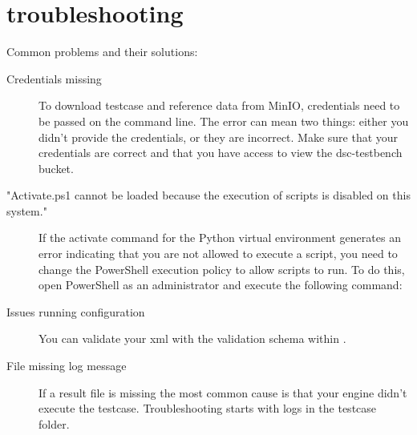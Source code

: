 \documentclass{deltares_memo}
\begin{document}
\section{troubleshooting}
\label{sec:troubleshooting}
Common problems and their solutions:
\begin{description}
\item[Credentials missing] To download testcase and reference data from MinIO, credentials need to be passed on the command line. The error can mean two things: either you didn't provide the credentials, or they are incorrect. Make sure that your credentials are correct and that you have access to view the dsc-testbench bucket.
\item["Activate.ps1 cannot be loaded because the execution of scripts is disabled on this system."] If the activate command for the Python virtual environment generates an error indicating that you are not allowed to execute a script, you need to change the PowerShell execution policy to allow scripts to run. To do this, open PowerShell as an administrator and execute the following command: 
\item[Issues running configuration] You can validate your xml with the validation schema within .
\item[File missing log message] If a result file is missing the most common cause is that your engine didn't execute the testcase. Troubleshooting starts with logs in the testcase folder.
\end{description}
\end{document}
